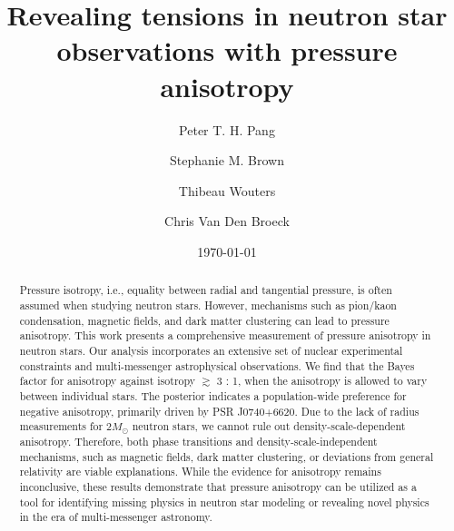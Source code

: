 \documentclass[prd,twocolumn,a4paper,floatfix,nofootinbib,preprintnumbers,superscriptaddress]{revtex4-1}
\begin{document}
\title[Revealing tensions in neutron star observations with pressure anisotropy]{Revealing tensions in neutron star observations with pressure anisotropy}

\author{Peter T. H. Pang }

\author{Stephanie M. Brown }

\author{Thibeau Wouters }

\author{Chris Van Den Broeck }

\date{\today}

\begin{abstract}
Pressure isotropy, i.e., equality between radial and tangential pressure, is often assumed when studying neutron stars. However, mechanisms such as pion/kaon condensation, magnetic fields, and dark matter clustering can lead to pressure anisotropy. This work presents a comprehensive measurement of pressure anisotropy in neutron stars. Our analysis incorporates an extensive set of nuclear experimental constraints and multi-messenger astrophysical observations. We find that the Bayes factor for anisotropy against isotropy $\gtrsim$ 3 : 1, when the anisotropy is allowed to vary between individual stars. The posterior indicates a population-wide preference for negative anisotropy, primarily driven by PSR J0740+6620. Due to the lack of radius measurements for $2M_\odot$ neutron stars, we cannot rule out density-scale-dependent anisotropy. Therefore, both phase transitions and density-scale-independent mechanisms, such as magnetic fields, dark matter clustering, or deviations from general relativity are viable explanations. While the evidence for anisotropy remains inconclusive, these results demonstrate that pressure anisotropy can be utilized as a tool for identifying missing physics in neutron star modeling or revealing novel physics in the era of multi-messenger astronomy.
\end{abstract}
\end{document}

